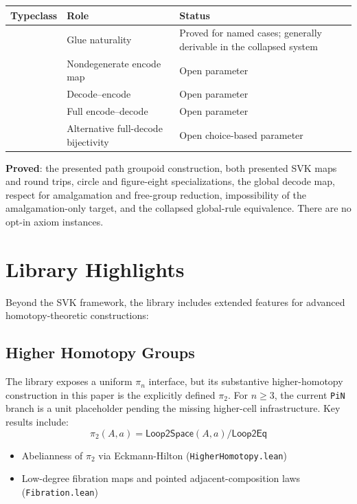 \documentclass{lmcs}
\theoremstyle{definition}
\theoremstyle{plain}
\theoremstyle{remark}
\newcommand{\piTwo}{\pi_2}
\newcommand{\piN}{\pi_n}
\begin{document}
\begin{center}
\footnotesize
\setlength{\tabcolsep}{4pt}
\begin{tabular}{@{}L{0.42\textwidth}L{0.20\textwidth}L{0.30\textwidth}@{}}
\toprule
\textbf{Typeclass} & \textbf{Role} & \textbf{Status} \\
\midrule
{} & Glue naturality & Proved for named
cases; generally derivable in the collapsed system \\
 & Nondegenerate encode map & Open parameter \\
 & Decode--encode & Open parameter \\
 & Full encode--decode & Open parameter \\
 & Alternative full-decode
bijectivity & Open choice-based parameter \\
\bottomrule
\end{tabular}
\end{center}

\textbf{Proved}: the presented path groupoid construction, both presented SVK
maps and round trips, circle and figure-eight specializations, the global
decode map, respect for amalgamation and free-group reduction, impossibility of
the amalgamation-only target, and the collapsed global-rule equivalence.  There
are no opt-in axiom instances.

\section{Library Highlights}
\label{sec:library-highlights}

Beyond the SVK framework, the library includes extended features for advanced homotopy-theoretic constructions:

\subsection{Higher Homotopy Groups}

The library exposes a uniform $\piN$ interface, but its substantive
higher-homotopy construction in this paper is the explicitly defined $\piTwo$.
For $n \geq 3$, the current \texttt{PiN} branch is a unit placeholder pending
the missing higher-cell infrastructure.  Key results include:
\[
\piTwo(A,a) = \mathsf{Loop2Space}(A,a)/\mathsf{Loop2Eq}
\]
\begin{itemize}
    \item Abelianness of $\piTwo$ via Eckmann-Hilton (\texttt{HigherHomotopy.lean})
    \item Low-degree fibration maps and pointed adjacent-composition laws
    (\texttt{Fibration.lean})
\end{itemize}
\end{document}
